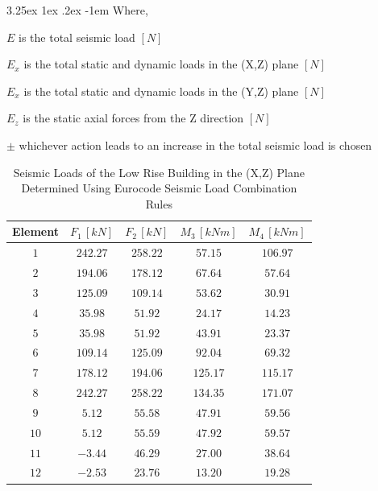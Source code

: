 \documentclass[11pt,a4paper,titlepage]{report}
\makeatletter
\renewcommand\paragraph{\@startsection{paragraph}{5}{\z@}%
  {3.25ex \@plus1ex \@minus.2ex}%
  {-1em}%
  {\normalfont\normalsize\bfseries}}
\makeatother
\begin{document}
\paragraph{}Where,
\begin{itemize}
    \begin{small}
    \item $E$ is the total seismic load $[N]$
    \item $E_x$ is the total static and dynamic loads in the (X,Z) plane $[N]$
    \item $E_x$ is the total static and dynamic loads in the (Y,Z) plane $[N]$
    \item $E_z$ is the static axial forces from the Z direction $[N]$
    \item $\pm$ whichever action leads to an increase in the total seismic load is chosen 
    \end{small}
\end{itemize}
\begin{table}[h]
    \centering
    \begin{tabular}{c|c|c|c|c}
    Element & $F_1 \,[kN]$ & $F_2 \,[kN]$ & $M_3\, [kNm]$ & $M_4 \,[kNm]$  \\
         \hline
    $1$ & $242.27$ & $258.22$ & $57.15 $ & $106.97$ \\
    $2$ & $194.06$ & $178.12$ & $67.64$ & $57.64$ \\
    $3$ & $125.09$ & $109.14$ & $53.62$ & $30.91$ \\
    $4$ & $35.98$ & $ 51.92$ & $24.17 $ & $14.23$ \\
    $5$ & $35.98$ & $51.92$ & $43.91$ & $23.37$ \\
    $6$ & $109.14$ & $125.09$ & $92.04$ & $69.32$ \\
    $7$ & $178.12$ & $194.06 $ & $125.17$ & $115.17$ \\
    $8$ & $242.27 $ & $ 258.22$ & $134.35$ & $171.07$ \\
    $9$ & $5.12$ & $55.58 $ & $47.91 $ & $59.56$ \\
    $10$ & $5.12$ & $55.59$ & $47.92$ & $59.57$ \\
    $11$ & $-3.44$ & $46.29$ & $27.00$ & $38.64$ \\
    $12$ & $ -2.53 $ & $23.76$ & $13.20 $ & $ 19.28$ \\
    \end{tabular}
    \caption{Seismic Loads of the Low Rise Building in the (X,Z) Plane Determined Using Eurocode Seismic Load Combination Rules}
    \label{tab:EC seimic load x}
\end{table}
\end{document}

